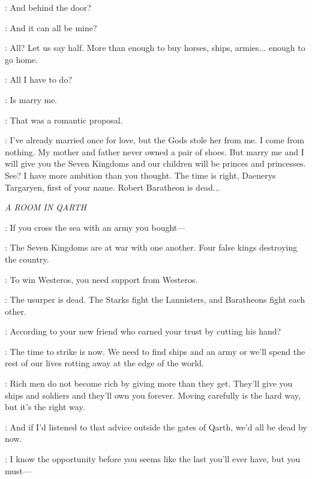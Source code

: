 
\DAENERYS: And behind the door? 


\DAENERYS: And it can all be mine? 

\XARO: All? Let us say half. More than enough to buy horses, ships, armies$\ldots$ enough to go home. 

\DAENERYS: All I have to do? 

\XARO: Is marry me. 

\DAENERYS: That was a romantic proposal. 

\XARO: I've already married once for love, but the Gods stole her from me. I come from nothing. My mother and father never owned a pair of shoes. But marry me and I will give you the Seven Kingdoms and our children will be princes and princesses. See? I have more ambition than you thought. The time is right, Daenerys Targaryen, first of your name. Robert Baratheon is dead$\ldots$ 



\scene

\textit{A ROOM IN QARTH} 


\JORAH: If you cross the sea with an army you bought--- 

\DAENERYS: The Seven Kingdoms are at war with one another. Four false kings destroying the country. 

\JORAH: To win Westeros, you need support from Westeros. 

\DAENERYS: The usurper is dead. The Starks fight the Lannisters, and Baratheons fight each other. 

\JORAH: According to your new friend who earned your trust by cutting his hand? 

\DAENERYS: The time to strike is now. We need to find ships and an army or we'll spend the rest of our lives rotting away at the edge of the world. 

\JORAH: Rich men do not become rich by giving more than they get. They'll give you ships and soldiers and they'll own you forever. Moving carefully is the hard way, but it's the right way. 

\DAENERYS: And if I'd listened to that advice outside the gates of Qarth, we'd all be dead by now. 

\JORAH: I know the opportunity before you seems like the last you'll ever have, but you must---  

